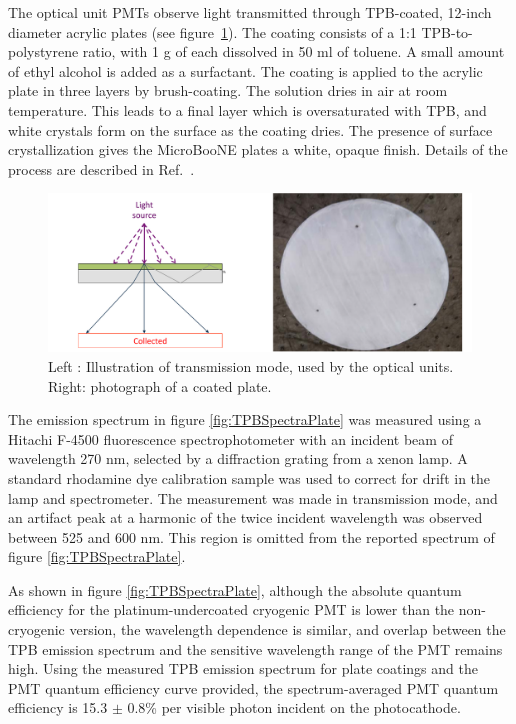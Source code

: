 The optical unit PMTs observe light transmitted through TPB-coated, 12-inch diameter acrylic plates (see figure~\ref{fig:PlateCoating}).
The coating consists of a 1:1 TPB-to-polystyrene ratio, with 1 g of each dissolved in 50 ml of toluene.  A small amount of ethyl alcohol is added as a surfactant.
The coating is applied to the acrylic plate in three layers by brush-coating.  The solution dries in air at room temperature.
This leads to a final layer which is oversaturated with TPB, and white crystals form on the surface as the coating dries.  The presence of surface crystallization gives the MicroBooNE plates a white, opaque finish. Details of the process are described in Ref.~\cite{Ignarra:2014-thesis}.

\begin{figure}[t]
\centering 
\includegraphics[width=\textwidth]{./light_figures/PlateModeAndPhoto.pdf}
\caption{Left : Illustration of transmission mode, used by the optical units. Right: photograph of a coated plate. \label{fig:PlateCoating}}
\end{figure}

The emission spectrum in figure \ref{fig:TPBSpectraPlate} was measured using a Hitachi F-4500 fluorescence spectrophotometer with an incident beam of wavelength 270 nm, selected by a diffraction grating from a xenon lamp.  A standard rhodamine dye calibration sample was used to correct for drift in the lamp and spectrometer.  The measurement was made in transmission mode, and an artifact peak at a harmonic of the twice incident wavelength was observed between 525 and 600 nm.  This region is omitted from the reported spectrum of figure \ref{fig:TPBSpectraPlate}.  

As shown in figure \ref{fig:TPBSpectraPlate}, although the absolute quantum efficiency for the platinum-undercoated cryogenic PMT is lower than the non-cryogenic version, the wavelength dependence is similar, and overlap between the TPB emission spectrum and the sensitive wavelength range of the PMT remains high.  Using the measured TPB emission spectrum for plate coatings and the PMT quantum efficiency curve provided, the spectrum-averaged PMT quantum efficiency is 15.3 $\pm$ 0.8\% per visible photon incident on the photocathode. 

